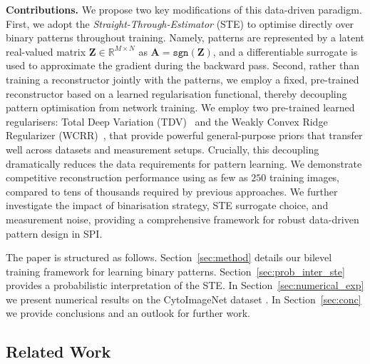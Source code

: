 \documentclass[lettersize,journal]{IEEEtran}
\begin{document}
\textbf{Contributions.} We propose two key modifications of this data-driven paradigm. First, we adopt the \textit{Straight-Through-Estimator} (STE) \cite{Bengio_2013_EstimatingPropagatingGradients} to optimise directly over binary patterns throughout training. Namely, patterns are represented by a latent real-valued matrix $\mathbf{Z} \in \mathbb{R}^{M \times N}$ as $\mathbf{A} = \texttt{sgn}(\mathbf{Z})$, and a differentiable surrogate is used to approximate the gradient during the backward pass. Second, rather than training a reconstructor jointly with the patterns, we employ a fixed, pre-trained reconstructor based on a learned regularisation functional, thereby decoupling pattern optimisation from network training. 
We employ two pre-trained learned regularisers: Total Deep Variation (TDV)~\cite{Kobler_2020_TotalDeepVariation} and the Weakly Convex Ridge Regularizer (WCRR)~\cite{Goujon_2023_LearningWeaklyConvex}, that provide powerful general-purpose priors that transfer well across datasets and measurement setups. 
Crucially, this decoupling dramatically reduces the data requirements for pattern learning.
We demonstrate competitive reconstruction performance using as few as $250$ training images, compared to tens of thousands required by previous approaches. We further investigate the impact of binarisation strategy, STE surrogate choice, and measurement noise, providing a comprehensive framework for robust data-driven pattern design in SPI.


The paper is structured as follows. 
Section~\ref{sec:method} details our bilevel training framework for learning binary patterns. 
Section~\ref{sec:prob_inter_ste} provides a probabilistic interpretation of the STE. 
In Section~\ref{sec:numerical_exp} we present numerical results on the CytoImageNet dataset \cite{Hua_2021_CytoImageNetLargescalePretraining}.
In Section~\ref{sec:conc} we provide conclusions and an outlook for further work.

\subsection{Related Work}
\end{document}
